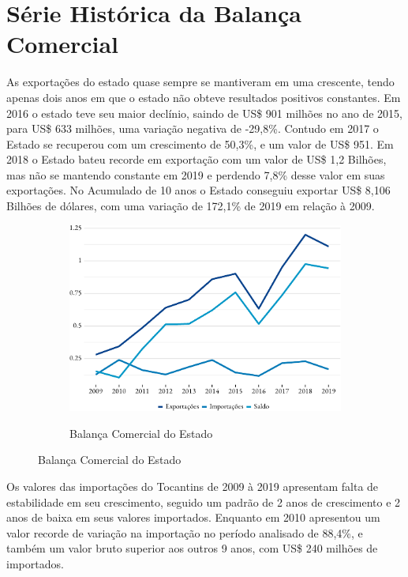 \section {Série Histórica da Balança Comercial}

\par As exportações do estado quase sempre se mantiveram em uma crescente, tendo
apenas dois anos em que o estado não obteve resultados positivos constantes. Em 2016 o estado teve seu maior declínio, saindo de US\$ 901 milhões no ano de 2015, para US\$ 633 milhões, uma variação negativa de  -29,8\%. 
Contudo em 2017 o Estado se recuperou com um crescimento de 50,3\%, e um valor de US\$ 951. Em 2018 o Estado bateu recorde em exportação com um valor de US\$ 1,2 Bilhões, mas não se mantendo constante em 2019 e perdendo 7,8\% desse valor em suas exportações.
No Acumulado de 10 anos o Estado conseguiu exportar US\$ 8,106 Bilhões de dólares, com uma variação de 172,1\% de 2019 em relação à 2009.

\begin{figure}[!h]
		\begin{subfigure}{\linewidth}
		\caption{Balança Comercial do Estado}
		\includegraphics{fig/total-1.pdf}
		\label{fig:balanca}
	\end{subfigure}
\end{figure}


\par Os valores das importações do Tocantins de 2009 à 2019 apresentam falta de estabilidade em seu crescimento, seguido um padrão de 2 anos de crescimento e 2 anos de baixa em seus valores importados. Enquanto em 2010 apresentou um valor recorde de variação na importação no período analisado de 88,4\%, e também um valor bruto superior aos outros 9 anos, com US\$ 240 milhões de importados.



